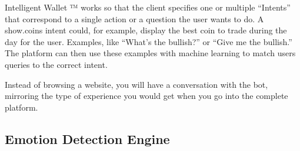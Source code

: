 \documentclass[	DIV=calc,%
							paper=letter,%
							fontsize=12pt%
                            ]{scrartcl}	 					%
\begin{document}
Intelligent Wallet ™ works so that the client specifies one or multiple “Intents” that correspond to a single action or a question the user wants to do. A show.coins intent could, for example, display the best coin to trade during the day for the user. Examples, like “What’s the bullish?” or “Give me the bullish.” The platform can then use these examples with machine learning to match users queries to the correct intent.

Instead of browsing a website, you will have a conversation with the bot, mirroring the type of experience you would get when you go into the complete platform.

\subsection{\label{sec:level1}Emotion Detection Engine}

%


\newpage


\end{document}
